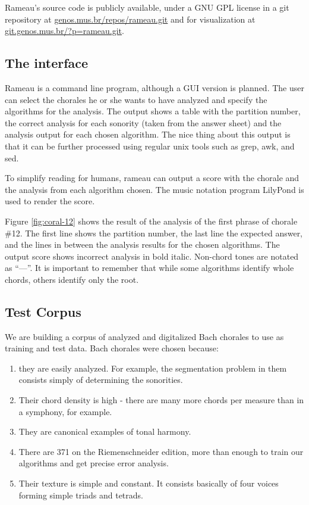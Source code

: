 \documentclass{article}
\begin{document}
Rameau's source code is publicly available, under a GNU GPL
\cite{fsf:gpl} license in a git \cite{baudis:git}
repository at \url{genos.mus.br/repos/rameau.git} and for
visualization at \url{git.genos.mus.br/?p=rameau.git}.

\subsection{The interface}
\label{sec:analysis-output}

Rameau is a command line program, although a GUI version is
planned. The user can select the chorales he or she wants to have
analyzed and specify the algorithms for the analysis. The output shows
a table with the partition number, the correct analysis for each
sonority (taken from the answer sheet) and the analysis output for each
chosen algorithm. The nice thing about this output is that it can be
further processed using regular unix tools such as grep, awk, and sed.

To simplify reading for humans, rameau can output a score with the
chorale and the analysis from each algorithm chosen. The music
notation program LilyPond is used to render the score.

Figure \ref{fig:coral-12} shows the result of the analysis of the
first phrase of chorale \#12. The first line shows the partition
number, the last line the expected answer, and the lines in between
the analysis results for the chosen algorithms. The output score shows
incorrect analysis in bold italic. Non-chord tones are notated as
``—''. It is important to remember that while some algorithms identify
whole chords, others identify only the root.

\subsection{Test Corpus}
\label{sec:test-corpus}

We are building a corpus of analyzed and digitalized Bach chorales to
use as training and test data. Bach chorales were chosen because:

\begin{enumerate}
\item they are easily analyzed. For example, the segmentation problem in
them consists simply of determining the sonorities.
\item Their chord density is high - there are many more chords per
  measure than in a symphony, for example.
\item They are canonical examples of tonal harmony.
\item There are 371 on the Riemenschneider edition, more than
  enough to train our algorithms and get precise error analysis.
\item Their texture is simple and constant. It consists basically of
  four voices forming simple triads and tetrads.
\end{enumerate}
\end{document}
